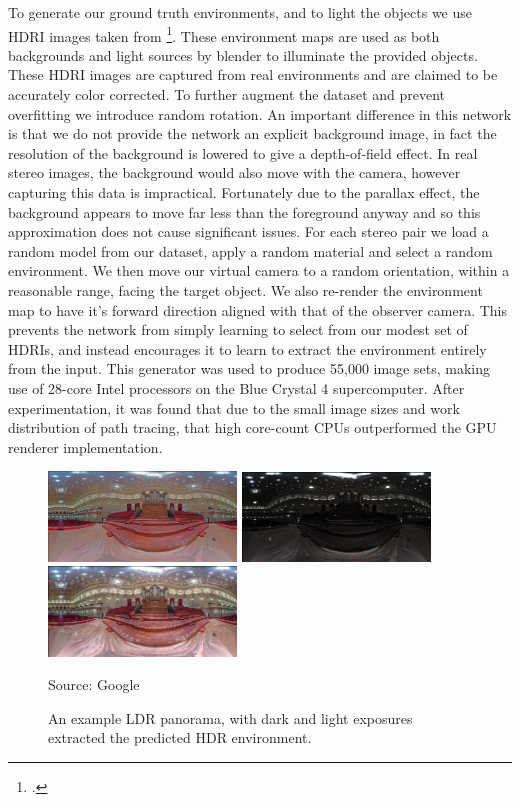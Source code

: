\documentclass[ %
                    author={Gavin Parker},
                supervisor={Dr. Neill Campbell},
                    degree={MEng},
                     title={Deep Siamese Networks for Illumination Estimation from Stereo Images},
                  subtitle={},
                      type={Research},
                      year={2018} ]{dissertation}
\begin{document}
\newline
To generate our ground truth environments, and to light the objects we use HDRI images taken from \footcite{https://hdrihaven.com/}. These environment maps are used as both backgrounds and light sources by blender to illuminate the provided objects. These HDRI images are captured from real environments and are claimed to be accurately color corrected. To further augment the dataset and prevent overfitting we introduce random rotation. An important difference in this network is that we do not provide the network an explicit background image, in fact the resolution of the background is lowered to give a depth-of-field effect. In real stereo images, the background would also move with the camera, however capturing this data is impractical. Fortunately due to the parallax effect, the background appears to move far less than the foreground anyway and so this approximation does not cause significant issues. For each stereo pair we load a random model from our dataset, apply a random material and select a random environment. We then move our virtual camera to a random orientation, within a reasonable range, facing the target object. We also re-render the environment map to have it's forward direction aligned with that of the observer camera. This prevents the network from simply learning to select from our modest set of HDRIs, and instead encourages it to learn to extract the environment entirely from the input. This generator was used to produce 55,000 image sets, making use of 28-core Intel processors on the Blue Crystal 4 supercomputer. After experimentation, it was found that due to the small image sizes and work distribution of path tracing, that high core-count CPUs outperformed the GPU renderer implementation.
\begin{figure}
\center
\includegraphics[width=5cm]{images/google_example/original}
\includegraphics[width=5cm]{images/google_example/dark}
\includegraphics[width=5cm]{images/google_example/bright}
\caption{An example LDR panorama, with dark and light exposures extracted the predicted HDR environment.}\label{fig:google}
Source: Google
\end{figure}
\end{document}
